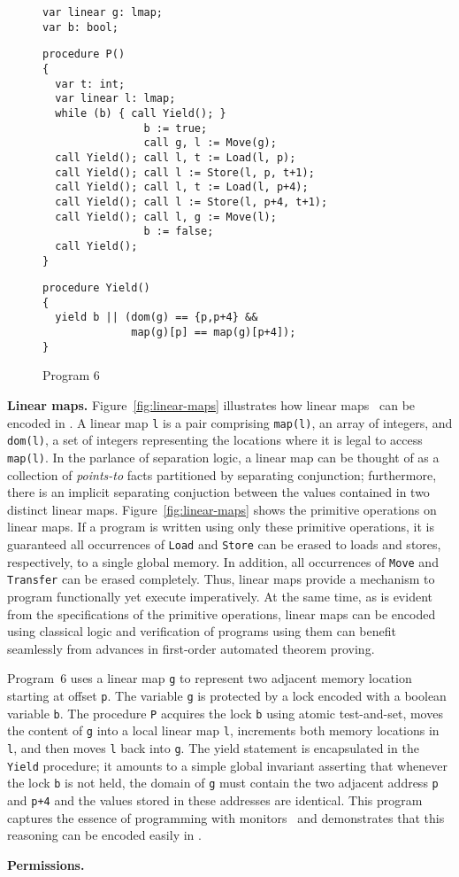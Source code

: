 \begin{figure}
\begin{verbatim}
var linear g: lmap;
var b: bool;
\end{verbatim}
\begin{verbatim}
procedure P()
{
  var t: int;
  var linear l: lmap;
  while (b) { call Yield(); }
                b := true;
                call g, l := Move(g);
  call Yield(); call l, t := Load(l, p);
  call Yield(); call l := Store(l, p, t+1);
  call Yield(); call l, t := Load(l, p+4);
  call Yield(); call l := Store(l, p+4, t+1);
  call Yield(); call l, g := Move(l);
                b := false;
  call Yield();
}
\end{verbatim}
\begin{verbatim}
procedure Yield() 
{
  yield b || (dom(g) == {p,p+4} && 
              map(g)[p] == map(g)[p+4]);
}
\end{verbatim}
\caption{Program 6}
\label{fig:ex6}
\end{figure}

{\bf Linear maps.}
Figure~\ref{fig:linear-maps} illustrates how linear maps~\cite{LahiriQW11} can be encoded in \civl.
A linear map {\tt l} is a pair comprising {\tt map(l)}, an array of integers, 
and {\tt dom(l)}, a set of integers representing the locations where it is legal to access {\tt map(l)}.
In the parlance of separation logic, a linear map can be thought of as a collection of
{\em points-to} facts partitioned by separating conjunction; 
furthermore, there is an implicit separating conjuction between the values contained in two distinct linear maps.
Figure~\ref{fig:linear-maps} shows the primitive operations on linear maps.
If a program is written using only these primitive operations, it is guaranteed all 
occurrences of {\tt Load} and {\tt Store} can be erased to loads and stores, respectively, 
to a single global memory.  
In addition, all occurrences of {\tt Move} and {\tt Transfer} can be erased completely.
Thus, linear maps provide a mechanism to program functionally yet execute imperatively.
At the same time, as is evident from the specifications of the primitive operations,
linear maps can be encoded using classical logic and verification of programs using them can benefit 
seamlessly from advances in first-order automated theorem proving.

Program~6 uses a linear map {\tt g} to represent two adjacent memory location starting at offset {\tt p}.
The variable {\tt g} is protected by a lock encoded with a boolean variable {\tt b}.
The procedure {\tt P} acquires the lock {\tt b} using atomic test-and-set, moves the content of {\tt g} into a local 
linear map {\tt l}, increments both memory locations in {\tt l}, and then moves {\tt l} back into {\tt g}.
The yield statement is encapsulated in the {\tt Yield} procedure; 
it amounts to a simple global invariant asserting that whenever the lock {\tt b} is not held, the domain of {\tt g} must
contain the two adjacent address {\tt p} and {\tt p+4} and the values stored in these addresses are identical.
This program captures the essence of programming with monitors~\cite{Hoare74} and demonstrates that this reasoning 
can be encoded easily in \civl.

{\bf Permissions.}


